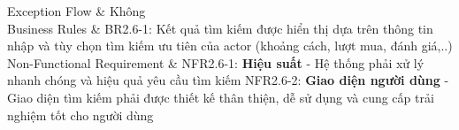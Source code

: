 \begin{usecase_table}
                    \hline
                    Exception Flow & Không\\
                    \hline
                    Business Rules	& BR2.6-1: Kết quả tìm kiếm được hiển thị dựa trên thông tin nhập và tùy chọn tìm kiếm ưu tiên của actor (khoảng cách, lượt mua, đánh giá,..)\\
                    \hline
                    Non-Functional Requirement & NFR2.6-1: \textbf{Hiệu suất} - Hệ thống phải xử lý nhanh chóng và hiệu quả yêu cầu tìm kiếm \newline
                    NFR2.6-2: \textbf{Giao diện người dùng} - Giao diện tìm kiếm phải được thiết kế thân thiện, dễ sử dụng và cung cấp trải nghiệm tốt cho người dùng
                    \\
                    \hline
                \end{usecase_table}
            \newpage    

